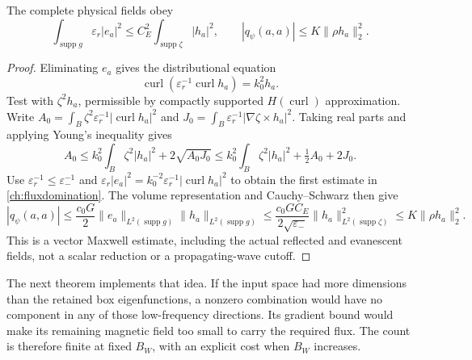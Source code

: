 \begin{lemma}
\label{ch:caccioppoli}
The complete physical fields obey
\begin{equation}
 \int_{\operatorname{supp}g}\varepsilon_r|e_a|^2
 \leq C_E^2\int_{\operatorname{supp}\zeta}|h_a|^2,
 \qquad
 |q_\psi(a,a)|\leq K\|\rho h_a\|_2^2.
 \label{ch:fluxdomination}
\end{equation}
\end{lemma}
\begin{proof}
Eliminating $e_a$ gives the distributional equation
\begin{equation}
 \operatorname{curl}(\varepsilon_r^{-1}\operatorname{curl}h_a)
 =k_0^2h_a.
 \label{ch:magneticsecond}
\end{equation}
Test with $\zeta^2h_a$, permissible by compactly supported
$H(\operatorname{curl})$ approximation.  Write
$A_0=\int_B\zeta^2\varepsilon_r^{-1}|\operatorname{curl}h_a|^2$ and
$J_0=\int_B\varepsilon_r^{-1}|\nabla\zeta\times h_a|^2$.
Taking real parts and applying Young's inequality gives
\begin{equation}
 A_0\leq k_0^2\int_B\zeta^2|h_a|^2+2\sqrt{A_0J_0}
 \leq k_0^2\int_B\zeta^2|h_a|^2+\tfrac12 A_0+2J_0.
 \label{ch:caccioppoliproof}
\end{equation}
Use $\varepsilon_r^{-1}\leq\varepsilon_-^{-1}$ and
$\varepsilon_r|e_a|^2=k_0^{-2}\varepsilon_r^{-1}
|\operatorname{curl}h_a|^2$ to obtain the first estimate in
\eqref{ch:fluxdomination}.  The volume representation and
Cauchy--Schwarz then give
\begin{equation}
 |q_\psi(a,a)|\leq\frac{c_0G}{2}
 \|e_a\|_{L^2(\operatorname{supp}g)}
 \|h_a\|_{L^2(\operatorname{supp}g)}
 \leq\frac{c_0GC_E}{2\sqrt{\varepsilon_-}}
 \|h_a\|_{L^2(\operatorname{supp}\zeta)}^2
 \leq K\|\rho h_a\|_2^2.
 \label{ch:fluxproof}
\end{equation}
This is a vector Maxwell estimate, including the actual reflected and
evanescent fields, not a scalar reduction or a propagating-wave cutoff.
\end{proof}

The next theorem implements that idea.  If the input space had more
dimensions than the retained box eigenfunctions, a nonzero combination would
have no component in any of those low-frequency directions.  Its gradient
bound would make its remaining magnetic field too small to carry the required
flux.  The count is therefore finite at fixed $B_W$, with an explicit cost
when $B_W$ increases.

